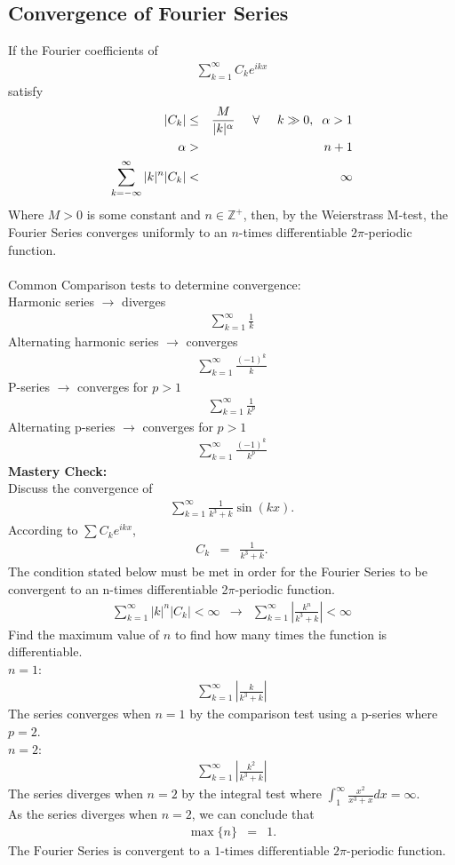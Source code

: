 \documentclass{article}
\def\Z{\mathbb{Z}}
\newcommand{\bea}{\begin{eqnarray*}}
\newcommand{\eea}{\end{eqnarray*}}
\begin{document}
\subsection{Convergence of Fourier Series}
If the Fourier coefficients of
\bea
\sum_{k=1}^{\infty}{C_ke^{ikx}}
\eea
satisfy
\bea
|C_k| &\leq& \frac{M}{|k|^\alpha} \hspace{5mm} \forall \hspace{5mm} k\gg0,\hspace{2mm} \alpha > 1\\
\alpha &>& n+1\\
\sum_{k=-\infty}^{\infty}{|k|^n|C_k|} &<& \infty
\eea
Where $M>0$ is some constant and $n \in \Z^+$, then, by the Weierstrass M-test, the Fourier Series converges uniformly to an $n$-times differentiable $2\pi$-periodic function.\\\\
Common Comparison tests to determine convergence:\\
Harmonic series $\longrightarrow$ diverges
\bea
\sum_{k=1}^{\infty}{\frac{1}{k}}
\eea
Alternating harmonic series $\longrightarrow$ converges
\bea
\sum_{k=1}^{\infty}{\frac{(-1)^k}{k}}
\eea
P-series $\longrightarrow$ converges for $p>1$
\bea
\sum_{k=1}^{\infty}{\frac{1}{k^p}}
\eea
Alternating p-series $\longrightarrow$ converges for $p>1$
\bea
\sum_{k=1}^{\infty}{\frac{(-1)^k}{k^p}}
\eea
\textbf{Mastery Check:}\\
Discuss the convergence of
\bea
\sum_{k=1}^{\infty}{\frac{1}{k^3+k}\sin(kx)}.
\eea
According to $\sum{C_ke^{ikx}}$,
\bea
C_k &=& \frac{1}{k^3+k}.
\eea
The condition stated below must be met in order for the Fourier Series to be convergent to an n-times differentiable 2$\pi$-periodic function.
\bea
\sum_{k=1}^{\infty}{|k|^n|C_k|<\infty} & \longrightarrow & \sum_{k=1}^{\infty}{\left|\frac{k^n}{k^3+k}\right|<\infty}
\eea
Find the maximum value of $n$ to find how many times the function is differentiable.\\
$n=1$:
\bea
\sum_{k=1}^{\infty}{\left|\frac{k}{k^3+k}\right|}
\eea
The series converges when $n=1$ by the comparison test using a p-series where $p=2$.\\
$n=2$:
\bea
\sum_{k=1}^{\infty}{\left|\frac{k^2}{k^3+k}\right|}
\eea
The series diverges when $n=2$ by the integral test where $\int_{1}^{\infty}{\frac{x^2}{x^3+x}dx} =\infty$.\\
As the series diverges when $n=2$, we can conclude that
\bea
\max\{n\} &=& 1.
\eea
$\boxed{\text{The Fourier Series is convergent to a 1-times differentiable $2\pi$-periodic function.}}$\\\\
\end{document}
